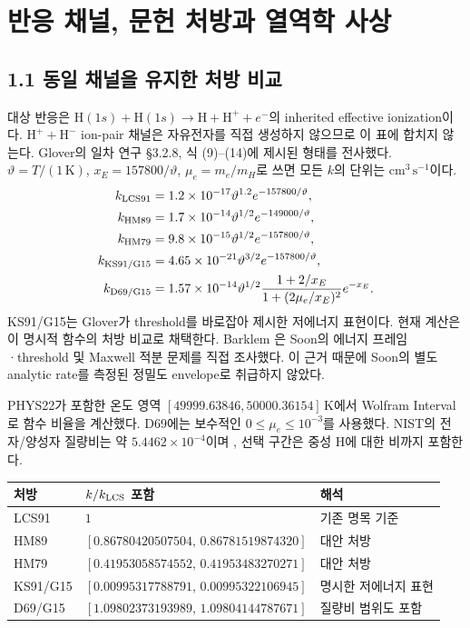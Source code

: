 \documentclass[11pt,a4paper]{article}
\begin{document}
\newpage
\section{반응 채널, 문헌 처방과 열역학 사상}
\subsection*{1.1 동일 채널을 유지한 처방 비교}
대상 반응은 $\mathrm H(1s)+\mathrm H(1s)\to\mathrm H+\mathrm H^++e^-$의 inherited effective ionization이다. $\mathrm H^++\mathrm H^-$ ion-pair 채널은 자유전자를 직접 생성하지 않으므로 이 표에 합치지 않는다. Glover의 일차 연구 \cite{glover} \S3.2.8, 식 (9)--(14)에 제시된 형태를 전사했다. $\vartheta=T/(1\,\mathrm K)$, $x_E=157800/\vartheta$, $\mu_e=m_e/m_H$로 쓰면 모든 $k$의 단위는 $\mathrm{cm^3\,s^{-1}}$이다.
\begin{align}
 k_{\rm LCS91}&=1.2\times10^{-17}\vartheta^{1.2}e^{-157800/\vartheta},\\
 k_{\rm HM89}&=1.7\times10^{-14}\vartheta^{1/2}e^{-149000/\vartheta},\\
 k_{\rm HM79}&=9.8\times10^{-15}\vartheta^{1/2}e^{-157800/\vartheta},\\
 k_{\rm KS91/G15}&=4.65\times10^{-21}\vartheta^{3/2}e^{-157800/\vartheta},\\
 k_{\rm D69/G15}&=1.57\times10^{-14}\vartheta^{1/2}
 \frac{1+2/x_E}{1+(2\mu_e/x_E)^2}e^{-x_E}.
\end{align}
KS91/G15는 Glover가 threshold를 바로잡아 제시한 저에너지 표현이다. 현재 계산은 이 명시적 함수의 처방 비교로 채택한다. Barklem \cite{barklem}은 Soon의 에너지 프레임·threshold 및 Maxwell 적분 문제를 직접 조사했다. 이 근거 때문에 Soon의 별도 analytic rate를 측정된 정밀도 envelope로 취급하지 않았다.

PHYS22가 포함한 온도 영역 $[49999.63846,50000.36154]\,\mathrm K$에서 Wolfram Interval로 함수 비율을 계산했다. D69에는 보수적인 $0\le\mu_e\le10^{-3}$를 사용했다. NIST의 전자/양성자 질량비는 약 $5.4462\times10^{-4}$이며 \cite{nist}, 선택 구간은 중성 H에 대한 비까지 포함한다.
\begin{center}\begin{tabular}{@{}lll@{}}\toprule
처방 & $k/k_{\rm LCS}$ 포함 & 해석\\\midrule
LCS91 & $1$ & 기존 명목 기준\\
HM89 & $[0.86780420507504,\,0.86781519874320]$ & 대안 처방\\
HM79 & $[0.41953058574552,\,0.41953483270271]$ & 대안 처방\\
KS91/G15 & $[0.00995317788791,\,0.00995322106945]$ & 명시한 저에너지 표현\\
D69/G15 & $[1.09802373193989,\,1.09804144787671]$ & 질량비 범위도 포함\\\bottomrule
\end{tabular}\end{center}
\end{document}
